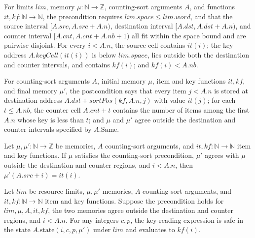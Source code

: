 \begin{definition}
\label{Light.CountSort.Pre}
\leanok
{}
For limits $lim$, memory $\mu:\mathbb{N}\to\mathbb{Z}$, counting-sort arguments $A$, and
functions $it,kf:\mathbb{N}\to\mathbb{N}$, the precondition requires
$lim.space\le lim.word$, and that the source interval $[A.src,A.src+A.n)$, destination
interval $[A.dst,A.dst+A.n)$, and counter interval $[A.cnt,A.cnt+A.nb+1)$ all fit within
the space bound and are pairwise disjoint. For every $i<A.n$, the source cell contains
$it(i)$; the key address $A.keyCell(it(i))$ is below $lim.space$, lies outside both the
destination and counter intervals, and contains $kf(i)$; and $kf(i)<A.nb$.
\end{definition}

\begin{definition}
\label{Light.CountSort.Post}
\leanok
{}
For counting-sort arguments $A$, initial memory $\mu$, item and key functions $it,kf$, and
final memory $\mu\prime$, the postcondition says that every item $j<A.n$ is stored at
destination address $A.dst+sortPos(kf,A.n,j)$ with value $it(j)$; for each $t\le A.nb$,
the counter cell $A.cnt+t$ contains the number of items among the first $A.n$ whose key
is less than $t$; and $\mu$ and $\mu\prime$ agree outside the destination and counter
intervals specified by $A.\mathrm{Same}$.
\end{definition}

\begin{theorem}
\label{Light.CountSort.Pre.item}
\leanok
{}
Let $\mu,\mu\prime:\mathbb{N}\to\mathbb{Z}$ be memories, $A$ counting-sort arguments, and
$it,kf:\mathbb{N}\to\mathbb{N}$ item and key functions. If $\mu$ satisfies the counting-sort
precondition, $\mu\prime$ agrees with $\mu$ outside the destination and counter regions,
and $i<A.n$, then $\mu\prime(A.src+i)=it(i)$.
\end{theorem}

\begin{theorem}
\label{Light.csKey_gives}
\leanok
{}
Let $lim$ be resource limits, $\mu,\mu\prime$ memories, $A$ counting-sort arguments, and
$it,kf:\mathbb{N}\to\mathbb{N}$ item and key functions. Suppose the precondition holds
for $lim,\mu,A,it,kf$, the two memories agree outside the destination and counter
regions, and $i<A.n$. For any integers $c,p$, the key-reading expression is safe in the
state $A.\mathrm{state}(i,c,p,\mu\prime)$ under $lim$ and evaluates to $kf(i)$.
\end{theorem}

